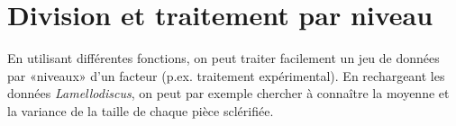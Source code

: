 \section{Division et traitement par niveau}

En utilisant différentes fonctions, on peut traiter facilement un jeu de données par «niveaux» d'un facteur (p.ex. traitement expérimental).
En rechargeant les données \emph{Lamellodiscus}, on peut par exemple chercher à connaître la moyenne et la variance de la taille de chaque pièce sclérifiée.

\begin{knitrout}
\color{fgcolor}\begin{kframe}
\begin{flushleft}
\ttfamily\noindent
{}\hlassignement{\usebox{\hlnormalsizeboxlessthan}-}{\ }\hlkeyword{(}\hlkeyword{,}{\ }\hlargument{=}{\ }\hlkeyword{,}{\ }\hlargument{=}{\ }\hlkeyword{)}\mbox{}
\normalfont
\end{flushleft}
\end{kframe}
\end{knitrout}

